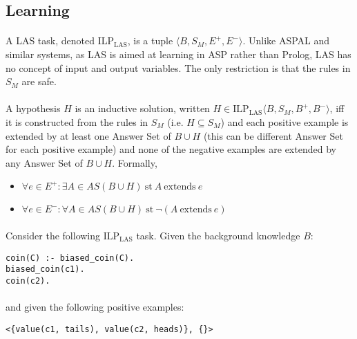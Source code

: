 \documentclass{article}
\theoremstyle{plain}
\theoremstyle{definition}
\begin{document}
\begin{multicols}{2}
\subsection{Learning}

\paragraph{} A LAS task, denoted $\text{ILP}_\text{LAS}$, is a tuple $\langle B, S_M, E^+, E^- \rangle$. Unlike ASPAL and similar systems, as LAS is aimed at learning in ASP rather than Prolog, LAS has no concept of input and output variables. The only restriction is that the rules in $S_M$ are safe. 

\paragraph{} A hypothesis $H$ is an inductive solution, written $H \in \text{ILP}_\text{LAS}\langle B, S_M, B^+, B^- \rangle$, iff it is constructed from the rules in $S_M$ (i.e. $H \subseteq S_M$) and each positive example is extended by at least one Answer Set of $B \cup H$ (this can be different Answer Set for each positive example) and none of the negative examples are extended by any Answer Set of $B \cup H$. Formally,

\begin{itemize}
\item $\forall e \in E^+: \exists A \in AS(B \cup H)\ \text{st}\ A\ \text{extends}\ e$
\item $\forall e \in E^-: \forall A \in AS(B \cup H)\ \text{st}\ \lnot(A\ \text{extends}\ e)$
\end{itemize}

\paragraph{} Consider the following $\text{ILP}_\text{LAS}$ task. Given the background knowledge $B$:

\begin{lstlisting}
coin(C) :- biased_coin(C).
biased_coin(c1).
coin(c2).
\end{lstlisting}

\paragraph{} and given the following positive examples:

\begin{lstlisting}
<{value(c1, tails), value(c2, heads)}, {}>
\end{lstlisting}


\end{multicols}
\end{document}
